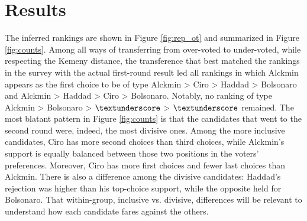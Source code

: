 \documentclass[hidelinks,11pt]{article} \usepackage[utf8]{inputenc}
\begin{document}
\section{Results} The inferred rankings are shown in Figure \ref{fig:rep_ot} and
summarized in Figure \ref{fig:counts}. Among all ways of transferring from
over-voted to under-voted, while respecting the Kemeny distance, the
transference that best matched the rankings in the survey with the actual
first-round result led all rankings in which Alckmin appears as the first choice
to be of type Alckmin > Ciro > Haddad > Bolsonaro and Alckmin > Haddad > Ciro >
Bolsonaro. Notably, no ranking of type Alckmin > Bolsonaro > \(\textunderscore\)
> \(\textunderscore\) remained. The most blatant pattern in Figure
\ref{fig:counts} is that the candidates that went to the second round were,
indeed, the most divisive ones. Among the more inclusive candidates, Ciro has
more second choices than third choices, while Alckmin's support is equally
balanced between those two positions in the voters' preferences. Moreover, Ciro
has more first choices and fewer last choices than Alckmin. There is also a
difference among the divisive candidates: Haddad's rejection was higher than his
top-choice support, while the opposite held for Bolsonaro. That within-group,
inclusive vs. divisive, differences will be relevant to understand how each
candidate fares against the others.
\end{document}
